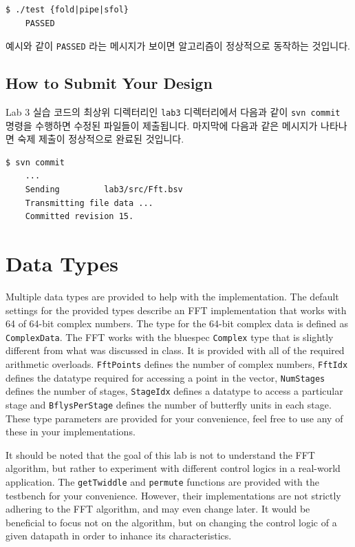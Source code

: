 \documentclass{article}
\begin{document}
\begin{Verbatim}[frame=single]
    $ ./test {fold|pipe|sfol}
    PASSED
\end{Verbatim}
예시와 같이 \texttt{PASSED} 라는 메시지가 보이면 알고리즘이 정상적으로 동작하는 것입니다.

\subsection{How to Submit Your Design}
Lab 3 실습 코드의 최상위 디렉터리인  \texttt{lab3} 디렉터리에서
다음과 같이 \texttt{svn commit} 명령을 수행하면 수정된 파일들이 제출됩니다.
마지막에 다음과 같은 메시지가 나타나면 숙제 제출이 정상적으로 완료된 것입니다.

\begin{Verbatim}[frame=single]
    $ svn commit
    ...
    Sending         lab3/src/Fft.bsv
    Transmitting file data ...
    Committed revision 15.
\end{Verbatim}

\section{Data Types}
Multiple data types are provided to help with the implementation.  The default
settings for the provided types describe an FFT implementation that works with
64 of 64-bit complex numbers.  The type for the 64-bit complex data is defined
as \texttt{ComplexData}.  The FFT works with the bluespec \texttt{Complex} type
that is slightly different from what was discussed in class. It is provided
with all of the required arithmetic overloads.  \texttt{FftPoints} defines the
number of complex numbers, \texttt{FftIdx} defines the datatype required for
accessing a point in the vector, \texttt{NumStages} defines the number of
stages, \texttt{StageIdx} defines a datatype to access a particular stage and
\texttt{BflysPerStage} defines the number of butterfly units in each stage.
These type parameters are provided for your convenience, feel free to use any
of these in your implementations.

It should be noted that the goal of this lab is not to understand the FFT algorithm,
but rather to experiment with different control logics in a real-world application.
The \texttt{getTwiddle} and \texttt{permute} functions are provided with the
testbench for your convenience. However, their implementations are not strictly
adhering to the FFT algorithm, and may even change later.
It would be beneficial to focus not on the algorithm, but on changing the
control logic of a given datapath in order to inhance its characteristics.
\end{document}

